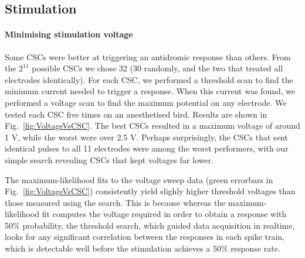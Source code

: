 \documentclass[10pt,letterpaper]{article}
\newcommand\fig[1]{Fig.~\ref{#1}}
\renewcommand{\subsubsection}[1]{\paragraph{#1}}
\newcommand{\noprint}[1]{}
\begin{document}
\subsection{Stimulation}

\subsubsection{Minimising stimulation voltage}

Some CSCs were better at triggering an antidromic response than
others.  From the $2^{11}$ possible CSCs we chose 32 (30 randomly, and
the two that treated all electrodes identically).  For each CSC, we
performed a threshold scan to find the minimum current needed to
trigger a response.  When this current was found, we performed a
voltage scan to find the maximum potential on any electrode.  We
tested each CSC five times on an anesthetised bird.  Results are shown
in \fig{fig:VoltageVsCSC}.  The best CSCs resulted in a maximum
voltage of around 1 V, while the worst were over 2.5 V.  Perhaps
surprisingly, the CSCs that sent identical pulses to all 11 electrodes
were among the worst performers, with our simple search revealing CSCs
that kept voltages far lower.

The maximum-likelihood fits to the voltage sweep data (green errorbars
in \fig{fig:VoltageVsCSC}) consistently yield slighly higher threshold
voltages than those measured using the search.  This is because
whereas the maximum-likelihood fit computes the voltage required in
order to obtain a response with 50\% probability, the threshold
search, which guided data acquisition in realtime, looks for any
significant correlation between the responses in each spike train,
which is detectable well before the stimulation achieves a 50\%
response rate.

\noprint{FIXME: The following caveat doesn't apply to
  lw95rhp-2015-12-04: Each threshold scan terminated when a
  stimulation voltage over 3 V was detected, so for some datasets
  (e.g. lw95rhp-2015-12-09) we were unable to acquire all five
  measurements for some CSCs, and thus they are worse than the figure
  shows.}
\end{document}
